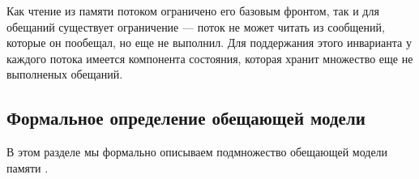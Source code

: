 Как чтение из памяти потоком ограничено его базовым фронтом, так и для обещаний существует ограничение ---
поток не может читать из сообщений, которые он пообещал, но еще не выполнил. Для поддержания этого инварианта
у каждого потока имеется компонента состояния, которая хранит множество еще не выполненых обещаний.

\subsection{Формальное определение обещающей модели}
\label{sec:promiseFormally}

В этом разделе мы формально описываем подмножество обещающей модели памяти \cite{Kang-al:POPL17}.

\begin{figure*}[t]
\small
{}
\end{figure*}
